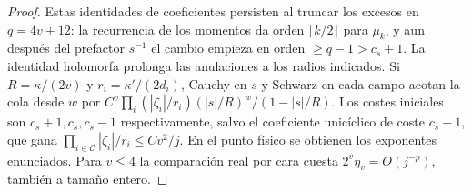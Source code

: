 \begin{proof}
Estas identidades de coeficientes persisten al truncar los excesos en \(q=4v+12\):
la recurrencia de los momentos da orden \(\lceil k/2\rceil\) para \(\mu_k\), y aun
después del prefactor \(s^{-1}\) el cambio empieza en orden \(\ge q-1>c_s+1\).
La identidad holomorfa prolonga las anulaciones a los radios indicados. Si \(R=\kappa/(2v)\)
y \(r_i=\kappa'/(2d_i)\), Cauchy en \(s\) y Schwarz en cada campo acotan la cola desde
\(w\) por \(C^v\prod_i(|\zeta_i|/r_i)(|s|/R)^w/(1-|s|/R)\).
Los costes iniciales son \(c_s+1,c_s,c_s-1\) respectivamente, salvo el coeficiente
unicíclico de coste \(c_s-1\), que gana \(\prod_{i\in\mathcal C}|\zeta_i|/r_i
\le Cv^2/j\). En el punto físico se obtienen los exponentes enunciados. Para \(v\le4\)
la comparación real por cara cuesta \(2^v\eta_v=O(j^{-p})\), también a tamaño entero.
\end{proof}
